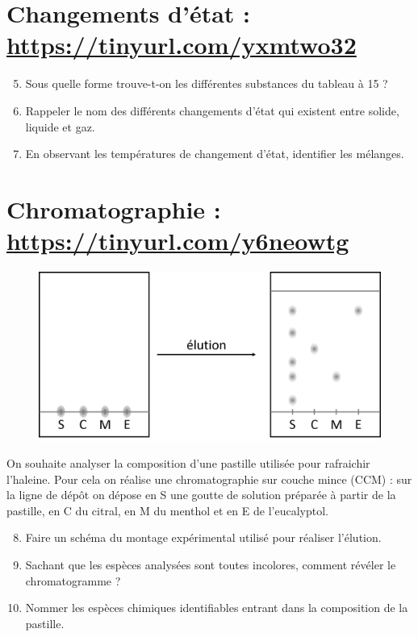 \section*{Changements d'état : \href{https://tinyurl.com/yxmtwo32}{https://tinyurl.com/yxmtwo32}}

\begin{enumerate}
\setcounter{enumi}{4}
\item Sous quelle forme trouve-t-on les différentes substances du tableau à \unit{15}{\celsius} ?
\item Rappeler le nom des différents changements d'état qui existent entre solide, liquide et gaz.
\item En observant les températures de changement d'état, identifier le\cdot s mélange\cdot s.
\end{enumerate}

\section*{Chromatographie : \href{https://tinyurl.com/y6neowtg}{https://tinyurl.com/y6neowtg}}

\begin{figure}[h!]
\center
\includegraphics[scale=0.25]{images/ccm.png}
\end{figure}

On souhaite analyser la composition d'une pastille utilisée pour rafraichir l'haleine.
Pour cela on réalise une chromatographie sur couche mince (CCM) : sur la ligne de dépôt on dépose en S une goutte de solution préparée à partir de la pastille, en C du citral, en M du menthol et en E de l'eucalyptol.

\begin{enumerate}
\setcounter{enumi}{7}
\item Faire un schéma du montage expérimental utilisé pour réaliser l'élution.
\item Sachant que les espèces analysées sont toutes incolores, comment révéler le chromatogramme ?
\item Nommer les espèces chimiques identifiables entrant dans la composition de la pastille.
\end{enumerate}

